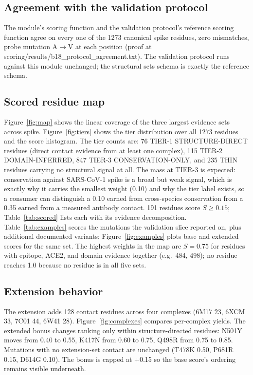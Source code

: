 \documentclass[11pt]{article}
\begin{document}
\subsection{Agreement with the validation protocol}
The module's scoring function and the validation protocol's reference scoring function agree on every one of the 1273 canonical spike residues, zero mismatches, probe mutation A$\to$V at each position (proof at scoring/results/b18\_protocol\_agreement.txt). The validation protocol runs against this module unchanged; the structural sets schema is exactly the reference schema.

\subsection{Scored residue map}
Figure~\ref{fig:map} shows the linear coverage of the three largest evidence sets across spike. Figure~\ref{fig:tiers} shows the tier distribution over all 1273 residues and the score histogram. The tier counts are: 76 TIER-1 STRUCTURE-DIRECT residues (direct contact evidence from at least one complex), 115 TIER-2 DOMAIN-INFERRED, 847 TIER-3 CONSERVATION-ONLY, and 235 THIN residues carrying no structural signal at all. The mass at TIER-3 is expected: conservation against SARS-CoV-1 spike is a broad but weak signal, which is exactly why it carries the smallest weight (0.10) and why the tier label exists, so a consumer can distinguish a 0.10 earned from cross-species conservation from a 0.35 earned from a measured antibody contact. 191 residues score $S \geq 0.15$; Table~\ref{tab:scored} lists each with its evidence decomposition. Table~\ref{tab:examples} scores the mutations the validation slice reported on, plus additional documented variants; Figure~\ref{fig:examples} plots base and extended scores for the same set. The highest weights in the map are $S=0.75$ for residues with epitope, ACE2, and domain evidence together (e.g.\ 484, 498); no residue reaches 1.0 because no residue is in all five sets.

\subsection{Extension behavior}
The extension adds 128 contact residues across four complexes (6M17 23, 6XCM 33, 7C01 44, 6W41 28). Figure~\ref{fig:complexes} compares per-complex yields. The extended bonus changes ranking only within structure-directed residues: N501Y moves from 0.40 to 0.55, K417N from 0.60 to 0.75, Q498R from 0.75 to 0.85. Mutations with no extension-set contact are unchanged (T478K 0.50, P681R 0.15, D614G 0.10). The bonus is capped at +0.15 so the base score's ordering remains visible underneath.
\end{document}
